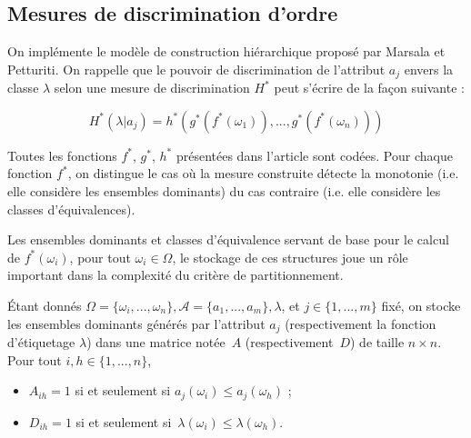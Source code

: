 \documentclass[a4paper]{article}
\begin{document}
%
%
%
%

\subsection{Mesures de discrimination d'ordre} 
On implémente le modèle de
construction hiérarchique proposé par Marsala et Petturiti. On rappelle que le
pouvoir de discrimination de l'attribut $a_j$ envers la classe $\lambda$ selon
une mesure de discrimination $H^*$ peut s'écrire de la façon suivante :

$$ H^*(\lambda | a_j) = h^*(g^*(f^*(\omega_1)),...,g^*(f^*(\omega_n)))$$

\noindent Toutes les fonctions $f^*$, $g^*$, $h^*$ présentées dans l'article
sont codées.  Pour chaque fonction $f^*$, on distingue le cas où la mesure
construite détecte la monotonie (i.e. elle considère les ensembles dominants) du
cas contraire (i.e.  elle considère les classes d'équivalences). 

Les ensembles dominants et classes d'équivalence servant de base pour le calcul
de $f^*(\omega_i)$, pour tout $\omega_i \in \Omega$, le stockage de ces
structures joue un rôle important dans la complexité du critère de
partitionnement.

Étant donnés $\Omega = \{\omega_i, ... , \omega_n\}, \mathcal{A} = \{a_1, ...,
a_m\}, \lambda$, et $j \in \{1, ..., m\}$ fixé, on stocke les ensembles
dominants générés par l'attribut $a_j$ (respectivement la fonction d'étiquetage $\lambda$) dans une matrice notée~$A$ (respectivement~$D$) de taille $n \times n$. Pour tout $i,
h \in \{1,...,n\}$,
\begin{itemize} 
    \item $A_{ih} = 1$ si et seulement si $a_j(\omega_i) \leq
a_j(\omega_h)$ ;
    \item $D_{ih}= 1$ si et seulement si~$\lambda(\omega_i) \leq \lambda(\omega_h)$.
\end{itemize}
\end{document}
